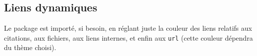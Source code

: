 \documentclass{main}
\begin{document}
\subsection{Liens dynamiques}

Le package  est importé, si besoin, en réglant juste la couleur des liens relatifs aux citations, aux fichiers, aux liens internes, et enfin aux \verb#url# (cette couleur dépendra du thème choisi).
\end{document}

